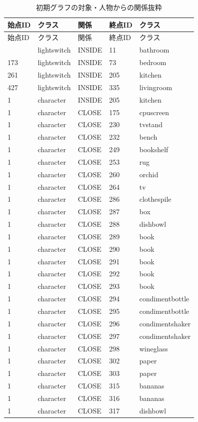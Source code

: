 {\scriptsize\setlength{\tabcolsep}{3pt}
\begin{longtable}{lllll}
\caption{初期グラフの対象・人物からの関係抜粋}\label{tab:real_edges_test_task6}\\
\hline
始点ID & クラス & 関係 & 終点ID & クラス\\\hline\endfirsthead
始点ID & クラス & 関係 & 終点ID & クラス\\\hline\endhead
\hline\endfoot
71 & lightswitch & INSIDE & 11 & bathroom \\
173 & lightswitch & INSIDE & 73 & bedroom \\
261 & lightswitch & INSIDE & 205 & kitchen \\
427 & lightswitch & INSIDE & 335 & livingroom \\
1 & character & INSIDE & 205 & kitchen \\
1 & character & CLOSE & 175 & cpuscreen \\
1 & character & CLOSE & 230 & tvstand \\
1 & character & CLOSE & 232 & bench \\
1 & character & CLOSE & 249 & bookshelf \\
1 & character & CLOSE & 253 & rug \\
1 & character & CLOSE & 260 & orchid \\
1 & character & CLOSE & 264 & tv \\
1 & character & CLOSE & 286 & clothespile \\
1 & character & CLOSE & 287 & box \\
1 & character & CLOSE & 288 & dishbowl \\
1 & character & CLOSE & 289 & book \\
1 & character & CLOSE & 290 & book \\
1 & character & CLOSE & 291 & book \\
1 & character & CLOSE & 292 & book \\
1 & character & CLOSE & 293 & book \\
1 & character & CLOSE & 294 & condimentbottle \\
1 & character & CLOSE & 295 & condimentbottle \\
1 & character & CLOSE & 296 & condimentshaker \\
1 & character & CLOSE & 297 & condimentshaker \\
1 & character & CLOSE & 298 & wineglass \\
1 & character & CLOSE & 302 & paper \\
1 & character & CLOSE & 303 & paper \\
1 & character & CLOSE & 315 & bananas \\
1 & character & CLOSE & 316 & bananas \\
1 & character & CLOSE & 317 & dishbowl \\
\end{longtable}}

